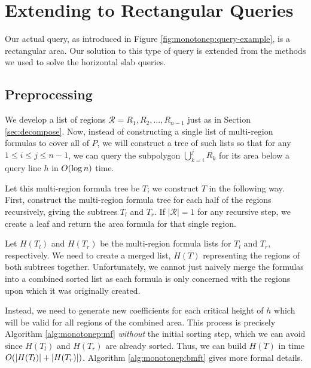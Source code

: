 \section{Extending to Rectangular Queries}
\label{:monotonep:rect}

Our actual query, as introduced in Figure \ref{fig:monotonep:query-example}, is a rectangular area. Our solution to this type of query is extended from the methods we used to solve the horizontal slab queries.

\subsection{Preprocessing}
\label{:monotonep:rect:pre}

We develop a list of regions $\mathcal{R} = R_1, R_2, \ldots, R_{n-1}$ just as in Section \ref{sec:decompose}.  Now, instead of constructing a single list of multi-region formulas to cover all of $P$, we will construct a tree of such lists so that for any $1 \leq i \leq j \leq n-1$, we can query the subpolygon $\bigcup_{k=i}^{j}{R_k}$ for its area below a query line $h$ in $O\!\left(\log{n}\right)$ time.

Let this multi-region formula tree be $T$; we construct $T$ in the following way. First, construct the multi-region formula tree for each half of the regions recursively, giving the subtrees $T_l$ and $T_r$. If $|\mathcal{R}| = 1$ for any recursive step, we create a leaf and return the area formula for that single region.

Let $H(T_l)$ and $H(T_r)$ be the multi-region formula lists for $T_l$ and $T_r$, respectively. 
We need to create a merged list, $H(T)$ representing the regions of both subtrees together. 
Unfortunately, we cannot just naively merge the formulas into a combined sorted list as each formula is only concerned with the regions upon which it was originally created. 

Instead, we need to generate new coefficients for each critical height of $h$ which will be valid for all regions of the combined area.
This process is precisely Algorithm \ref{alg:monotonep:mf} \emph{without} the initial sorting step, which we can avoid since $H(T_l)$ and $H(T_r)$ are already sorted.
Thus, we can build $H(T)$ in time $O\!\left(|H(T_l)| + |H(T_r)|\right)$.
Algorithm \ref{alg:monotonep:bmft} gives more formal details.

